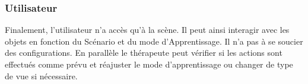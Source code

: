 \subsubsection{Utilisateur}
Finalement, l'utilisateur n'a accès qu'à la scène. Il peut ainsi interagir avec les objets en fonction du Scénario et du mode d'Apprentissage. Il n'a pas à se soucier des configurations. En parallèle le thérapeute peut vérifier si les actions sont effectués comme prévu et réajuster le mode d'apprentissage ou changer de type de vue si nécessaire.
